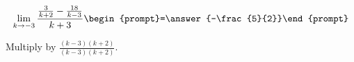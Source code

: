 \documentclass{ximera}
\author{Bart Snapp}
\begin{document}
\begin{exercise}

\[
\lim_{k\to -3 } \frac{\frac{3}{k+2}-\frac{18}{k-3}}{k+3}  \begin{prompt}=\answer{-\frac{5}{2}}\end{prompt}
\]
\begin{hint}
Multiply by $\frac{(k-3) (k+2)}{(k-3) (k+2)}$.
\end{hint}
\end{exercise}
\end{document}
